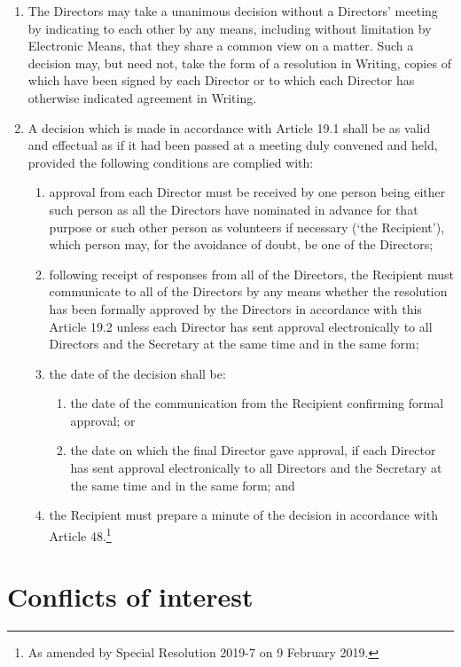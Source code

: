 \documentclass[a4paper,12pt]{article}
\begin{document}
\begin{enumerate}
  \item The Directors may take a unanimous decision without a Directors' meeting by indicating to each other by any means, including without limitation by Electronic Means, that they share a common view on a matter. Such a decision may, but need not, take the form of a resolution in Writing, copies of which have been signed by each Director or to which each Director has otherwise indicated agreement in Writing.
  \item A decision which is made in accordance with Article 19.1 shall be as valid and effectual as if it had been passed at a meeting duly convened and held, provided the following conditions are complied with:
  \begin{enumerate}
    \item approval from each Director must be received by one person being either such person as all the Directors have nominated in advance for that purpose or such other person as volunteers if necessary (`the Recipient'), which person may, for the avoidance of doubt, be one of the Directors;
    \item following receipt of responses from all of the Directors, the Recipient must communicate to all of the Directors by any means whether the resolution has been formally approved by the Directors in accordance with this Article 19.2 unless each Director has sent approval electronically to all Directors and the Secretary at the same time and in the same form;
    \item the date of the decision shall be:
    \begin{enumerate}
      \item the date of the communication from the Recipient confirming formal approval; or
      \item the date on which the final Director gave approval, if each Director has sent approval electronically to all Directors and the Secretary at the same time and in the same form; and
    \end{enumerate}
    \item the Recipient must prepare a minute of the decision in accordance with Article 48.\footnote{As amended by Special Resolution 2019-7 on 9 February 2019.}
  \end{enumerate}
\end{enumerate}

\section{Conflicts of interest}
\end{document}
